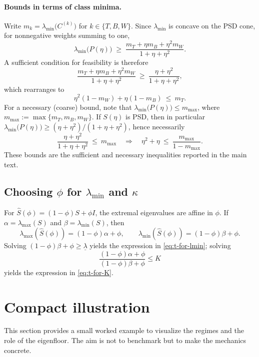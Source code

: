 \documentclass[12pt,letterpaper]{article}
\begin{document}
\paragraph{Bounds in terms of class minima.}
Write \(m_k=\lambda_{\min}\!\bigl(C^{(k)}\bigr)\) for \(k\in\{T,B,W\}\).
Since \(\lambda_{\min}\) is concave on the PSD cone, for nonnegative weights summing to one,
\[
\lambda_{\min}\!\bigl(P(\eta)\bigr)
\;\ge\;
\frac{m_T+\eta m_B+\eta^2 m_W}{1+\eta+\eta^2}.
\]
A sufficient condition for feasibility is therefore
\[
\frac{m_T+\eta m_B+\eta^2 m_W}{1+\eta+\eta^2}
\ \ge\
\frac{\eta+\eta^2}{1+\eta+\eta^2},
\]
which rearranges to
\[
\eta^2(1-m_W)+\eta(1-m_B)\ \le\ m_T.
\]
For a necessary (coarse) bound, note that \(\lambda_{\min}\!\bigl(P(\eta)\bigr)\le m_{\max}\),
where \(m_{\max}:=\max\{m_T,m_B,m_W\}\). If \(S(\eta)\) is PSD, then in particular
\(\lambda_{\min}\!\bigl(P(\eta)\bigr)\ge (\eta+\eta^2)/(1+\eta+\eta^2)\), hence necessarily
\[
\frac{\eta+\eta^2}{1+\eta+\eta^2}\ \le\ m_{\max}
\quad\Longrightarrow\quad
\eta^2+\eta\ \le\ \frac{m_{\max}}{1-m_{\max}}.
\]
These bounds are the sufficient and necessary inequalities reported in the main text.

\subsection{Choosing \(\phi\) for \(\lambda_{\min}\) and \(\kappa\)}

For \(\widehat S(\phi)=(1-\phi)S+\phi I\), the extremal eigenvalues are affine in \(\phi\). If \(\alpha=\lambda_{\max}(S)\)
and \(\beta=\lambda_{\min}(S)\), then
\[
\lambda_{\max}(\widehat S(\phi)) = (1-\phi)\alpha + \phi,\qquad
\lambda_{\min}(\widehat S(\phi)) = (1-\phi)\beta + \phi.
\]
Solving \((1-\phi)\beta+\phi\ge\underline\lambda\) yields the expression in \eqref{eq:t-for-lmin}; solving
\[
\frac{(1-\phi)\alpha+\phi}{(1-\phi)\beta+\phi}\le K
\]
yields the expression in \eqref{eq:t-for-K}.

\section{Compact illustration}
\label{sec:CompactIllustration}

This section provides a small worked example to visualize the regimes and the role of the eigenfloor. The aim is not to benchmark but to make the mechanics concrete.
\end{document}
